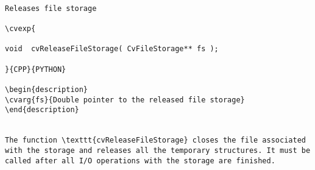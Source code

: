 \begin{verbatim}

Releases file storage

\cvexp{

void  cvReleaseFileStorage( CvFileStorage** fs );

}{CPP}{PYTHON}

\begin{description}
\cvarg{fs}{Double pointer to the released file storage}
\end{description}


The function \texttt{cvReleaseFileStorage} closes the file associated with the storage and releases all the temporary structures. It must be called after all I/O operations with the storage are finished.


\end{verbatim}
